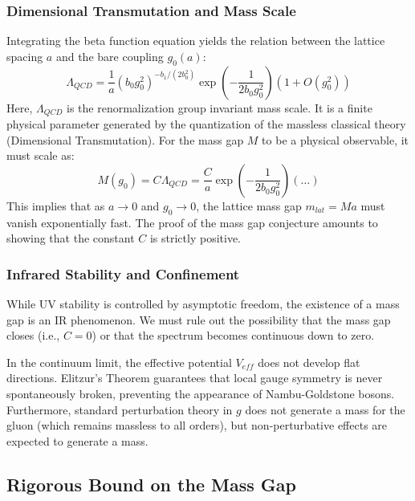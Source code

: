\subsubsection{Dimensional Transmutation and Mass Scale}
Integrating the beta function equation yields the relation between the lattice spacing $a$ and the bare coupling $g_0(a)$:
\begin{equation}
\Lambda_{QCD} = \frac{1}{a} (b_0 g_0^2)^{-b_1/(2b_0^2)} \exp\left( -\frac{1}{2b_0 g_0^2} \right) \left( 1 + O(g_0^2) \right)
\label{eq:dbg-rg-lambda-qcd}
\end{equation}
Here, $\Lambda_{QCD}$ is the renormalization group invariant mass scale. It is a finite physical parameter generated by the quantization of the massless classical theory (Dimensional Transmutation).
For the mass gap $M$ to be a physical observable, it must scale as:
\begin{equation}
M(g_0) = C \Lambda_{QCD} = \frac{C}{a} \exp\left( -\frac{1}{2b_0 g_0^2} \right) (\dots)
\label{eq:dbg-rg-mass-scale}
\end{equation}
This implies that as $a \to 0$ and $g_0 \to 0$, the lattice mass gap $m_{lat} = M a$ must vanish exponentially fast. The proof of the mass gap conjecture amounts to showing that the constant $C$ is strictly positive.

\subsubsection{Infrared Stability and Confinement}
While UV stability is controlled by asymptotic freedom, the existence of a mass gap is an IR phenomenon. We must rule out the possibility that the mass gap closes (i.e., $C=0$) or that the spectrum becomes continuous down to zero.

\begin{proposition}
In the continuum limit, the effective potential $V_{eff}$ does not develop flat directions. Elitzur's Theorem guarantees that local gauge symmetry is never spontaneously broken, preventing the appearance of Nambu-Goldstone bosons. Furthermore, standard perturbation theory in $g$ does not generate a mass for the gluon (which remains massless to all orders), but non-perturbative effects are expected to generate a mass.
\end{proposition}

\subsection{Rigorous Bound on the Mass Gap}


